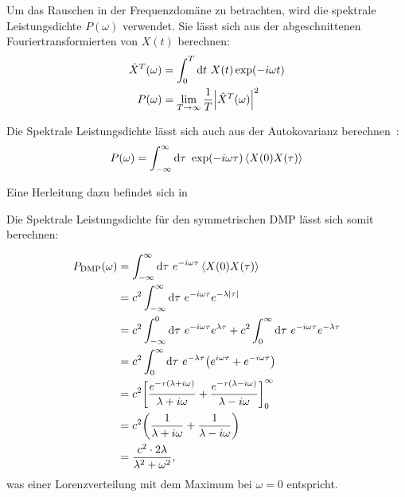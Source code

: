 \documentclass[main.tex]{subfiles}
\begin{document}
Um das Rauschen in der Frequenzdomäne zu betrachten, wird die spektrale
Leistungsdichte \(P(\omega)\) verwendet. Sie lässt sich aus der abgeschnittenen
Fouriertransformierten von \(X(t)\) berechnen:
\begin{align}
	\hat{X}^T(\omega) & = \int_0^T \mathrm{d} t \ X(t) \exp(-i \omega
	t)
	\\
	P(\omega)         & = \lim_{T \to \infty} \frac{1}{T}
	\abs{\hat{X}^T(\omega)}^2
\end{align}

Die Spektrale Leistungsdichte lässt sich auch aus der Autokovarianz berechnen~\cite{Petroni}:
\begin{align}
	P(\omega) = \int_{-\infty}^{\infty} \mathrm{d} \tau \ \exp(-i \omega
	\tau) \expval{X(0) X(\tau)}
\end{align}

Eine Herleitung dazu befindet sich in~\cite{Petroni}

Die Spektrale Leistungsdichte für den symmetrischen DMP lässt sich somit
berechnen:

\begin{align}
	P_\text{DMP}(\omega) & = \int_{-\infty}^{\infty} \dif \tau \ e^{-i
			\omega \tau} \expval{X(0)X(\tau)}\nonumber
	\\
	                     & = c^2 \int_{-\infty}^{\infty} \dif \tau \ e^{-i
			\omega
			\tau}e^{-\lambda \abs{\tau}}\nonumber
	\\
	                     & = c^2 \int_{-\infty}^{0} \dif \tau \ e^{-i
			\omega \tau}e^{\lambda
	\tau} + c^2 \int_{0}^{\infty} \dif \tau \ e^{-i \omega \tau}e^{-\lambda
	\tau}\nonumber
	\\
	                     & = c^2 \int_{0}^{\infty} \dif \tau \ e^{-\lambda
			\tau} \qty(e^{i \omega
		\tau} + e^{-i \omega \tau})\nonumber
	\\
	                     & = c^2 \qty[\frac{e^{-\tau(\lambda +
					i\omega)}}{\lambda + i\omega} +
		\frac{e^{-\tau(\lambda - i\omega)}}{\lambda -
			i\omega}]_{0}^{\infty}\nonumber
	\\
	                     & = c^2\qty(\frac{1}{\lambda + i\omega} +
	\frac{1}{\lambda -
		i\omega})\nonumber
	\\
	                     & = \frac{c^2 \cdot 2\lambda}{\lambda^2 +
		\omega^2},
\end{align}
was einer Lorenzverteilung mit dem Maximum bei \(\omega=0\) entspricht.

\end{document}
